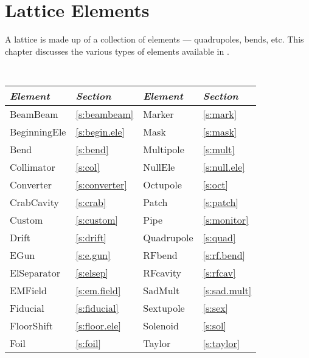 \chapter{Lattice Elements}
\label{c:elements}


A lattice is made up of a collection of elements --- quadrupoles,
bends, etc. This chapter discusses the various types of elements
available in \bmad.

\begin{table}[htb]
\centering
{\tt
\begin{tabular}{llll} \toprule
  {\it Element}    & {\it Section}         & {\it Element}      & {\it Section}       \\ \midrule
  BeamBeam         & \ref{s:beambeam}      &  Marker            & \ref{s:mark}        \\ 
  BeginningEle     & \ref{s:begin.ele}     &  Mask              & \ref{s:mask}        \\
  Bend             & \ref{s:bend}          &  Multipole         & \ref{s:mult}        \\
  Collimator       & \ref{s:col}           &  NullEle           & \ref{s:null.ele}    \\
  Converter        & \ref{s:converter}     &  Octupole          & \ref{s:oct}         \\
  CrabCavity       & \ref{s:crab}          &  Patch             & \ref{s:patch}       \\
  Custom           & \ref{s:custom}        &  Pipe              & \ref{s:monitor}     \\  
  Drift            & \ref{s:drift}         &  Quadrupole        & \ref{s:quad}        \\
  EGun             & \ref{s:e.gun}         &  RFbend            & \ref{s:rf.bend}     \\
  ElSeparator      & \ref{s:elsep}         &  RFcavity          & \ref{s:rfcav}       \\ 
  EMField          & \ref{s:em.field}      &  SadMult           & \ref{s:sad.mult}    \\
  Fiducial         & \ref{s:fiducial}      &  Sextupole         & \ref{s:sex}         \\
  FloorShift       & \ref{s:floor.ele}     &  Solenoid          & \ref{s:sol}         \\
  Foil             & \ref{s:foil}          &  Taylor            & \ref{s:taylor}      \\

\end{tabular}}
\end{table}
